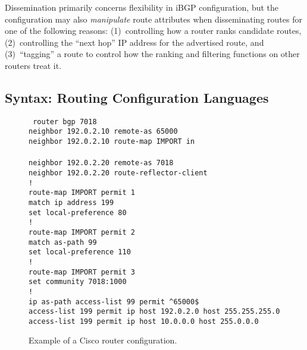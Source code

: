 Dissemination primarily concerns flexibility in iBGP configuration, but
the configuration may also {\em manipulate} route attributes when
disseminating routes for one of the following reasons: (1)~controlling
how a router ranks candidate routes, (2)~controlling the ``next hop'' IP
address for the advertised route, and (3)~``tagging'' a route to control
how the ranking and filtering functions on other routers treat it.


\subsection{Syntax: Routing Configuration Languages}\label{sec:configuration}

\begin{figure}
{\tt
        router bgp 7018\\
          \hspace*{0.2in} neighbor 192.0.2.10 remote-as 65000\\
          \hspace*{0.2in} neighbor 192.0.2.10 route-map IMPORT in\\ \\
          \hspace*{0.2in} neighbor 192.0.2.20 remote-as 7018\\
          \hspace*{0.2in} neighbor 192.0.2.20 route-reflector-client\\
        !\\
        route-map IMPORT permit 1\\
          \hspace*{0.2in} match ip address 199\\
          \hspace*{0.2in} set local-preference 80\\
        !\\
        route-map IMPORT permit 2\\
          \hspace*{0.2in} match as-path 99\\
          \hspace*{0.2in} set local-preference 110\\
        !\\
        route-map IMPORT permit 3\\
          \hspace*{0.2in} set community 7018:1000\\
        !\\
        ip as-path access-list 99 permit \^{}65000\$ \\
        access-list 199 permit ip host 192.0.2.0 host 255.255.255.0\\
        access-list 199 permit ip host 10.0.0.0 host 255.0.0.0
}
\caption{Example of a Cisco router configuration.}
\label{fig:cisco_config}
\end{figure}

